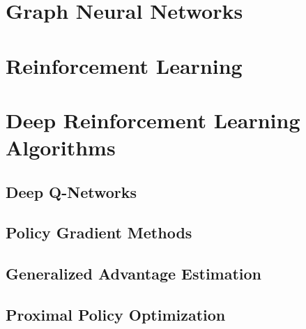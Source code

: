\section{Graph Neural Networks}


\section{Reinforcement Learning}


\section{Deep Reinforcement Learning Algorithms}

\subsection{Deep Q-Networks}
\subsection{Policy Gradient Methods}
\subsection{Generalized Advantage Estimation}
\subsection{Proximal Policy Optimization}